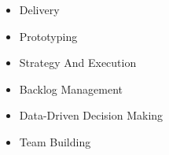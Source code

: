 
  \begin{itemize}
    \setlength\itemsep{-0.3em}
    \item Delivery
    \item Prototyping
    \item Strategy And Execution 
    \item Backlog Management 
    \item Data-Driven Decision Making
    \wt{
    }
    \item Team Building
  \end{itemize}

  
